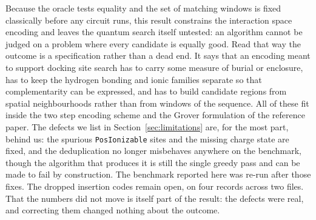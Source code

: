 Because the oracle tests equality and the set of matching windows is fixed classically
before any circuit runs, this result constrains the interaction space encoding and leaves
the quantum search itself untested: an algorithm cannot be judged on a problem where
every candidate is equally good. Read that way the outcome is a specification rather than
a dead end. It says that an encoding meant to support docking site search has to carry
some measure of burial or enclosure, has to keep the hydrogen bonding and ionic families
separate so that complementarity can be expressed, and has to build candidate regions
from spatial neighbourhoods rather than from windows of the sequence. All of these fit
inside the two step encoding scheme and the Grover formulation of the reference paper.
The defects we list in Section~\ref{sec:limitations} are, for the most part, behind us:
the spurious \texttt{PosIonizable} sites and the missing charge state are fixed, and the
deduplication no longer misbehaves anywhere on the benchmark, though the algorithm that
produces it is still the single greedy pass and can be made to fail by construction. The
benchmark reported here was re-run after those fixes. The dropped insertion codes remain
open, on four records across two files. That the
numbers did not move is itself part of the result: the defects were real, and correcting
them changed nothing about the outcome.
